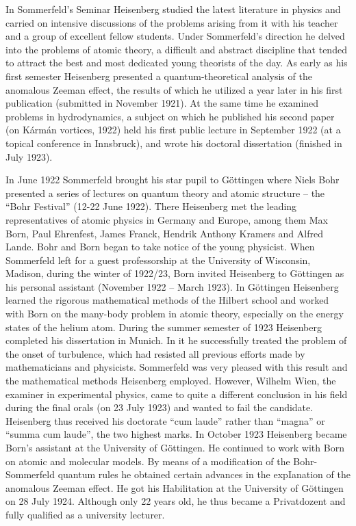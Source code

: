 \documentclass{article}
\begin{document}
In Sommerfeld's Seminar Heisenberg studied the latest literature in physics and carried on intensive discussions of the problems arising from it with his teacher and a group of excellent fellow students. Under Sommerfeld's direction he delved into the problems of atomic theory, a difficult and abstract discipline that tended to attract the best and most dedicated young theorists of the day. As early as his first semester Heisenberg presented a quantum-theoretical analysis of the anomalous Zeeman effect, the results of which he utilized a year later in his first publication (submitted in November 1921). At the same time he examined problems in hydrodynamics, a subject on which he published his second paper (on Kármán vortices, 1922) held his first public lecture in September 1922 (at a topical conference in Innsbruck), and wrote his doctoral dissertation (finished in July 1923).

In June 1922 Sommerfeld brought his star pupil to Göttingen where Niels Bohr presented a series of lectures on quantum theory and atomic structure – the “Bohr Festival” (12-22 June 1922). There Heisenberg met the leading representatives of atomic physics in Germany and Europe, among them Max Born, Paul Ehrenfest, James Franck, Hendrik Anthony Kramers and Alfred Lande. Bohr and Born began to take notice of the young physicist. When Sommerfeld left for a guest professorship at the University of Wisconsin, Madison, during the winter of 1922/23, Born invited Heisenberg to Göttingen as his personal assistant (November 1922 – March 1923). In Göttingen Heisenberg learned the rigorous mathematical methods of the Hilbert school and worked with Born on the many-body problem in atomic theory, especially on the energy states of the helium atom.
During the summer semester of 1923 Heisenberg completed his dissertation in Munich. In it he successfully treated the problem of the onset of turbulence, which had resisted all previous efforts made by mathematicians and physicists. Sommerfeld was very pleased with this result and the mathematical methods Heisenberg employed. However, Wilhelm Wien, the examiner in experimental physics, came to quite a different conclusion in his field during the final orals (on 23 July 1923) and wanted to fail the candidate. Heisenberg thus received his doctorate “cum laude” rather than “magna” or “summa cum laude”, the two highest marks. In October 1923 Heisenberg became Born's assistant at the University of Göttingen. He continued to work with Born on atomic and molecular models. By means of a modification of the Bohr-Sommerfeld quantum rules he obtained certain advances in the expIanation of the anomalous Zeeman effect. He got his Habilitation at the University of Göttingen on 28 July 1924. Although only 22 years old, he thus became a Privatdozent and fully qualified as a university lecturer.
\end{document}
